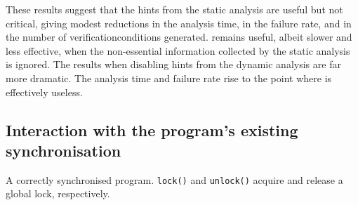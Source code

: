 These results suggest that the hints from the static analysis are
useful but not critical, giving modest reductions in the analysis
time, in the failure rate, and in the number of
\glspl{verificationcondition} generated.  {\technique} remains useful,
albeit slower and less effective, when the non-essential information
collected by the static analysis is ignored.  The results when
disabling hints from the dynamic analysis are far more dramatic.  The
analysis time and failure rate rise to the point where {\technique} is
effectively useless.  

\subsection{Interaction with the program's existing synchronisation}

\begin{sanefig}
  \vspace{-12pt}
  \caption{A correctly synchronised program.  \texttt{lock()} and
    \texttt{unlock()} acquire and release a global lock,
    respectively.}
  \label{fig:eval:existing_sync}
\end{sanefig}

